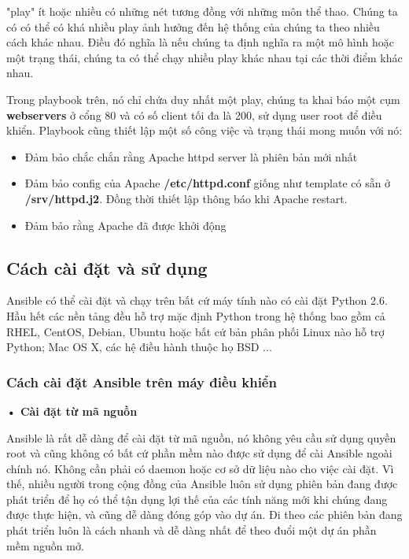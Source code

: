 "play" ít hoặc nhiều có những nét tương đồng với những môn thể thao. Chúng ta có có thể có khá nhiều play ảnh hưởng đến hệ thống của chúng ta theo nhiều cách khác nhau. Điều đó nghĩa là nếu chúng ta định nghĩa ra một mô hình hoặc một trạng thái, chúng ta có thể chạy nhiều play khác nhau tại các thời điểm khác nhau.

Trong playbook trên, nó chỉ chứa duy nhất một play, chúng ta khai báo một cụm \textbf{webservers} ở cổng 80 và có số client tối đa là 200, sử dụng user root để điều khiển. Playbook cũng thiết lập một số công việc và trạng thái mong muốn với nó:

\begin{itemize}
\item Đảm bảo chắc chắn rằng Apache httpd server là phiên bản mới nhất
\item Đảm bảo config của Apache \textbf{/etc/httpd.conf} giống như template có sẵn ở \textbf{/srv/httpd.j2}. Đồng thời thiết lập thông báo khi Apache restart.
\item Đảm bảo rằng Apache đã được khởi động
\end{itemize}

\subsection{Cách cài đặt và sử dụng}

Ansible có thể cài đặt và chạy trên bất cứ máy tính nào có cài đặt Python 2.6. Hầu hết các nền tảng đều hỗ trợ mặc định Python trong hệ thống bao gồm cả RHEL, CentOS, Debian, Ubuntu hoặc bất cứ bản phân phối Linux nào hỗ trợ Python; Mac OS X, các hệ điều hành thuộc họ BSD ...

\subsubsection{Cách cài đặt Ansible trên máy điều khiển}

\textbf{• Cài đặt từ mã nguồn}

Ansible là rất dễ dàng để cài đặt từ mã nguồn, nó không yêu cầu sử dụng quyền root và cũng không có bất cứ phần mềm nào được sử dụng để cài Ansible ngoài chính nó. Không cần phải có daemon hoặc cơ sở dữ liệu nào cho việc cài đặt. Vì thế, nhiều người trong cộng đồng của Ansible luôn sử dụng phiên bản đang được phát triển để họ có thể tận dụng lợi thế của các tính năng mới khi chúng đang được thực hiện, và cũng dễ dàng đóng góp vào dự án. Đi theo các phiên bản đang phát triển luôn là cách nhanh và dễ dàng nhất để theo đuổi một dự án phần mềm nguồn mở.


